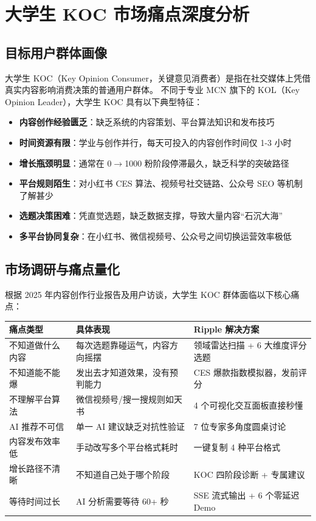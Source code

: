 \documentclass[12pt,a4paper]{ctexart}
\begin{document}
\section{大学生 KOC 市场痛点深度分析}

\subsection{目标用户群体画像}

大学生 KOC（Key Opinion Consumer，关键意见消费者）是指在社交媒体上凭借真实内容影响消费决策的普通用户群体。
不同于专业 MCN 旗下的 KOL（Key Opinion Leader），大学生 KOC 具有以下典型特征：

\begin{itemize}
  \item \textbf{内容创作经验匮乏}：缺乏系统的内容策划、平台算法知识和发布技巧
  \item \textbf{时间资源有限}：学业与创作并行，每天可投入的内容创作时间仅 1-3 小时
  \item \textbf{增长瓶颈明显}：通常在 0$\rightarrow$1000 粉阶段停滞最久，缺乏科学的突破路径
  \item \textbf{平台规则陌生}：对小红书 CES 算法、视频号社交链路、公众号 SEO 等机制了解甚少
  \item \textbf{选题决策困难}：凭直觉选题，缺乏数据支撑，导致大量内容``石沉大海''
  \item \textbf{多平台协同复杂}：在小红书、微信视频号、公众号之间切换运营效率极低
\end{itemize}

\subsection{市场调研与痛点量化}

根据 2025 年内容创作行业报告及用户访谈，大学生 KOC 群体面临以下核心痛点：

\begin{center}
{\small
\begin{tabular}{p{3.5cm} p{5cm} p{5.5cm}}
\toprule
\textbf{痛点类型} & \textbf{具体表现} & \textbf{Ripple 解决方案} \\
\midrule
不知道做什么内容 & 每次选题靠碰运气，内容方向摇摆 & 领域雷达扫描 + 6 大维度评分选题 \\[3pt]
不知道能不能爆 & 发出去才知道效果，没有预判能力 & CES 爆款指数模拟器，发前评分 \\[3pt]
不理解平台算法 & 微信视频号/搜一搜规则如天书 & 4 个可视化交互面板直接秒懂 \\[3pt]
AI 推荐不可信 & 单一 AI 建议缺乏对抗性验证 & 7 位专家多角度圆桌讨论 \\[3pt]
内容发布效率低 & 手动改写多个平台格式耗时 & 一键复制 4 种平台格式 \\[3pt]
增长路径不清晰 & 不知道自己处于哪个阶段 & KOC 四阶段诊断 + 专属建议 \\[3pt]
等待时间过长 & AI 分析需要等待 60+ 秒 & SSE 流式输出 + 6 个零延迟 Demo \\
\bottomrule
\end{tabular}
}
\end{center}
\end{document}
